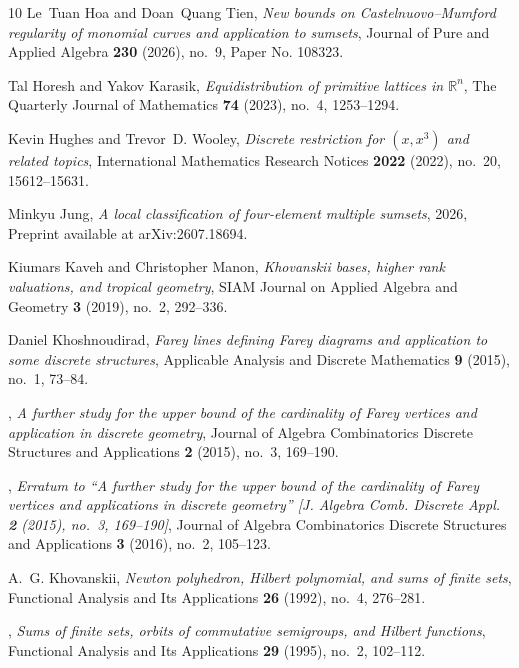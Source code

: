 \documentclass[11pt,reqno]{amsart}
\theoremstyle{definition}
\theoremstyle{remark}
\begin{document}
\begin{sloppypar}
\begin{thebibliography}{10}
Le~Tuan Hoa and Doan~Quang Tien, \emph{New bounds on {Castelnuovo--Mumford} regularity of monomial curves and application to sumsets}, Journal of Pure and Applied Algebra \textbf{230} (2026), no.~9, Paper No. 108323.

Tal Horesh and Yakov Karasik, \emph{Equidistribution of primitive lattices in {$\mathbb R^n$}}, The Quarterly Journal of Mathematics \textbf{74} (2023), no.~4, 1253--1294.

Kevin Hughes and Trevor~D. Wooley, \emph{Discrete restriction for $(x,x^3)$ and related topics}, International Mathematics Research Notices \textbf{2022} (2022), no.~20, 15612--15631.

Minkyu Jung, \emph{A local classification of four-element multiple sumsets}, 2026, Preprint available at arXiv:2607.18694.

Kiumars Kaveh and Christopher Manon, \emph{Khovanskii bases, higher rank valuations, and tropical geometry}, SIAM Journal on Applied Algebra and Geometry \textbf{3} (2019), no.~2, 292--336.

Daniel Khoshnoudirad, \emph{Farey lines defining {Farey} diagrams and application to some discrete structures}, Applicable Analysis and Discrete Mathematics \textbf{9} (2015), no.~1, 73--84.

\bysame, \emph{A further study for the upper bound of the cardinality of {Farey} vertices and application in discrete geometry}, Journal of Algebra Combinatorics Discrete Structures and Applications \textbf{2} (2015), no.~3, 169--190.

\bysame, \emph{Erratum to ``{A} further study for the upper bound of the cardinality of {Farey} vertices and applications in discrete geometry'' [{J}. Algebra Comb. Discrete Appl. \textbf{2} (2015), no.~3, 169--190]}, Journal of Algebra Combinatorics Discrete Structures and Applications \textbf{3} (2016), no.~2, 105--123.

A.~G. Khovanskii, \emph{Newton polyhedron, {Hilbert} polynomial, and sums of finite sets}, Functional Analysis and Its Applications \textbf{26} (1992), no.~4, 276--281.

\bysame, \emph{Sums of finite sets, orbits of commutative semigroups, and {Hilbert} functions}, Functional Analysis and Its Applications \textbf{29} (1995), no.~2, 102--112.


\end{thebibliography}
\end{sloppypar}
\end{document}
